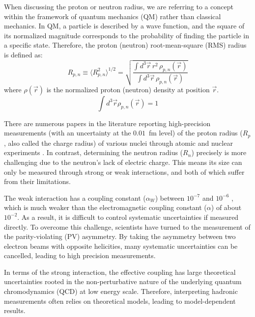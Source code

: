 When discussing the proton or neutron radius, we are referring to a concept within the framework of quantum mechanics (QM) rather than classical mechanics. In QM, a particle is described by a wave function, and the square of its normalized magnitude corresponds to the probability of finding the particle in a specific state. Therefore, the proton (neutron) root-mean-square (RMS) radius is defined as:
\begin{equation}
    R_{p, n} \equiv \langle R_{p,n}^2\rangle^{1/2} = \sqrt{\frac{\int d^3\vec{r}\,r^2\,\rho_{p,n}(\vec{r})}{\int d^3\vec{r}\,\rho_{p,n}(\vec{r})}}
    \label{eq:nucleon_rms_radius}
\end{equation}
where $\rho(\vec{r})$ is the normalized proton (neutron) density at position $\vec{r}$.
\begin{equation}
    \int d^3\vec{r} \rho_{p, n}(\vec{r}) = 1 
\end{equation}

There are numerous papers in the literature reporting high-precision measurements
(with an uncertainty at the $0.01$~fm level) of the proton radius ($R_p$, also called
the charge radius) of various nuclei through atomic and nuclear experiments \cite{DEVRIES1987495, ANGELI201369}. 
In contrast, determining the neutron radius ($R_n$) precisely is more challenging 
due to the neutron's lack of electric charge. This means its size can only be 
measured through strong or weak interactions, and both of which suffer from their limitations.

The weak interaction has a coupling constant ($\alpha_W$) between $10^{-7}$ and $10^{-6}$ \cite{hyperphysics}, which is much weaker than the electromagnetic coupling constant ($\alpha$) of about $10^{-2}$. As a result, it is difficult to control systematic uncertainties if measured directly. To overcome this challenge, scientists have turned to the measurement of the parity-violating (PV) asymmetry. By taking the asymmetry between two electron beams with opposite helicities, many systematic uncertainties can be cancelled, leading to high precision measurements.

In terms of the strong interaction, the effective coupling has large theoretical uncertainties rooted 
in the non-perturbative nature of the underlying quantum chromodynamics (QCD) at low energy scale.
Therefore, interpreting hadronic measurements often relies on theoretical models, leading to model-dependent results.

